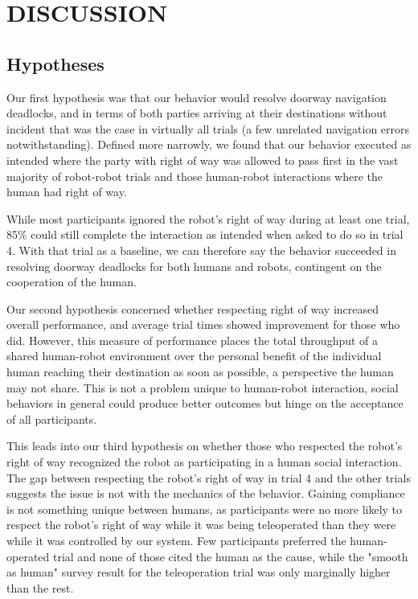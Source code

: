 \documentclass[letterpaper, 10 pt, conference]{ieeeconf}  %
\begin{document}
\section{DISCUSSION}

\subsection{Hypotheses}

Our first hypothesis was that our behavior would resolve doorway navigation deadlocks, and in terms of both parties arriving at their destinations without incident that was the case in virtually all trials (a few unrelated navigation errors notwithstanding). Defined more narrowly, we found that our behavior executed as intended where the party with right of way was allowed to pass first in the vast majority of robot-robot trials and those human-robot interactions where the human had right of way. 

While most participants ignored the robot's right of way during at least one trial, 85\% could still complete the interaction as intended when asked to do so in trial 4. With that trial as a baseline, we can therefore say the behavior succeeded in resolving doorway deadlocks for both humans and robots, contingent on the cooperation of the human.

Our second hypothesis concerned whether respecting right of way increased overall performance, and average trial times showed  improvement for those who did. However, this measure of performance places the total throughput of a shared human-robot environment over the personal benefit of the individual human reaching their destination as soon as possible, a perspective the human may not share. This is not a problem unique to human-robot interaction, social behaviors in general could produce better outcomes but hinge on the acceptance of all participants.

This leads into our third hypothesis on whether those who respected the robot's right of way recognized the robot as participating in a human social interaction. The gap between respecting the robot's right of way in trial 4 and the other trials suggests the issue is not with the mechanics of the behavior. Gaining compliance is not something unique between humans, as participants were no more likely to respect the robot's right of way while it was being teleoperated than they were while it was controlled by our system. Few participants preferred the human-operated trial and none of those cited the human as the cause, while the "smooth as human" survey result for the teleoperation trial was only marginally higher than the rest.
\end{document}
